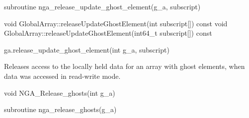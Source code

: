 \documentclass[10pt]{article}
\begin{document}
\begin{fapi}
\begin{fcode}
subroutine nga_release_update_ghost_element(g_a, subscript)
\end{fcode}
\begin{funcargs}
\end{funcargs}
\end{fapi}

\begin{cxxapi}
\begin{cxxcode}
void GlobalArray::releaseUpdateGhostElement(int subscript[]) const
void GlobalArray::releaseUpdateGhostElement(int64_t subscript[]) const
\end{cxxcode}
\begin{funcargs}
\end{funcargs}
\end{cxxapi}

\begin{pyapi}
\begin{pycode}
ga.release_update_ghost_element(int g_a, subscript)
\end{pycode}
\begin{funcargs}
\end{funcargs}
\end{pyapi}

\local

\begin{desc}

Releases access to the locally held data for an array with ghost elements, when
data was accessed in read-write mode.

\end{desc}



\begin{capi}
\begin{ccode}
void NGA_Release_ghosts(int g_a)
\end{ccode}
\begin{funcargs}
\end{funcargs}
\end{capi}

\begin{fapi}
\begin{fcode}
subroutine nga_release_ghosts(g_a)
\end{fcode}
\begin{funcargs}
\end{funcargs}
\end{fapi}
\end{document}
